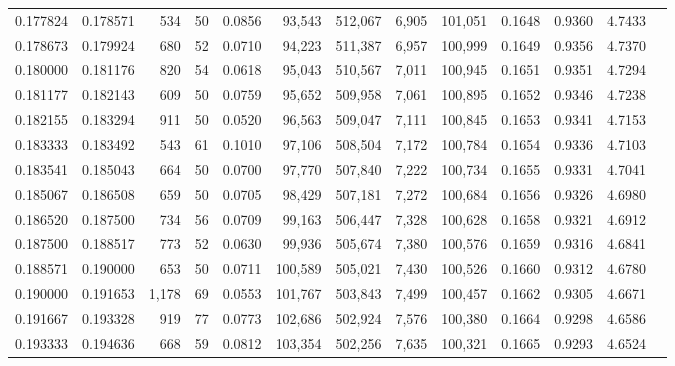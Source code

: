 \begin{tabular}{rrrrrrrrrrrrr}
0.177824 & 0.178571 &    534 &    50 &                                     0.0856 &  93,543 & 512,067 &   6,905 & 101,051 & 0.1648 & 0.9360 & 4.7433 \\
0.178673 & 0.179924 &    680 &    52 &                                     0.0710 &  94,223 & 511,387 &   6,957 & 100,999 & 0.1649 & 0.9356 & 4.7370 \\
0.180000 & 0.181176 &    820 &    54 &                                     0.0618 &  95,043 & 510,567 &   7,011 & 100,945 & 0.1651 & 0.9351 & 4.7294 \\
0.181177 & 0.182143 &    609 &    50 &                                     0.0759 &  95,652 & 509,958 &   7,061 & 100,895 & 0.1652 & 0.9346 & 4.7238 \\
0.182155 & 0.183294 &    911 &    50 &                                     0.0520 &  96,563 & 509,047 &   7,111 & 100,845 & 0.1653 & 0.9341 & 4.7153 \\
0.183333 & 0.183492 &    543 &    61 &                                     0.1010 &  97,106 & 508,504 &   7,172 & 100,784 & 0.1654 & 0.9336 & 4.7103 \\
0.183541 & 0.185043 &    664 &    50 &                                     0.0700 &  97,770 & 507,840 &   7,222 & 100,734 & 0.1655 & 0.9331 & 4.7041 \\
0.185067 & 0.186508 &    659 &    50 &                                     0.0705 &  98,429 & 507,181 &   7,272 & 100,684 & 0.1656 & 0.9326 & 4.6980 \\
0.186520 & 0.187500 &    734 &    56 &                                     0.0709 &  99,163 & 506,447 &   7,328 & 100,628 & 0.1658 & 0.9321 & 4.6912 \\
0.187500 & 0.188517 &    773 &    52 &                                     0.0630 &  99,936 & 505,674 &   7,380 & 100,576 & 0.1659 & 0.9316 & 4.6841 \\
0.188571 & 0.190000 &    653 &    50 &                                     0.0711 & 100,589 & 505,021 &   7,430 & 100,526 & 0.1660 & 0.9312 & 4.6780 \\
0.190000 & 0.191653 &  1,178 &    69 &                                     0.0553 & 101,767 & 503,843 &   7,499 & 100,457 & 0.1662 & 0.9305 & 4.6671 \\
0.191667 & 0.193328 &    919 &    77 &                                     0.0773 & 102,686 & 502,924 &   7,576 & 100,380 & 0.1664 & 0.9298 & 4.6586 \\
0.193333 & 0.194636 &    668 &    59 &                                     0.0812 & 103,354 & 502,256 &   7,635 & 100,321 & 0.1665 & 0.9293 & 4.6524 \\

\end{tabular}
